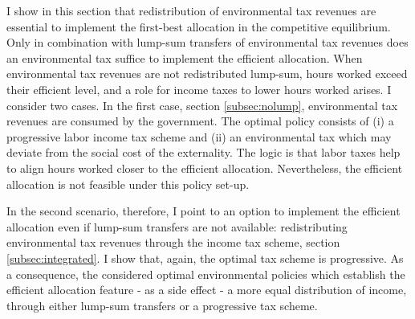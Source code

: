 I show in this section that redistribution of environmental tax revenues are essential to implement the first-best allocation in the competitive equilibrium. Only in combination with lump-sum transfers of  environmental tax revenues does an environmental tax suffice to implement the efficient allocation. %
When environmental tax revenues are not redistributed lump-sum, hours worked exceed their efficient level, and a role for income taxes to lower hours worked arises. I consider two cases.
In the first case, section \ref{subsec:nolump}, environmental tax revenues are consumed by the government. The optimal policy consists of (i) a progressive labor income tax scheme and (ii) an environmental tax which may deviate from the social cost of the externality. The logic is that labor taxes help to align hours worked closer to the efficient allocation. 
Nevertheless, the efficient allocation is not feasible under this policy set-up.

In the second scenario, therefore, I point to an option to implement the efficient allocation even if lump-sum transfers are not available: redistributing environmental tax revenues through the income tax scheme, section \ref{subsec:integrated}.
 I show that, again, the optimal tax scheme is progressive. 
As a consequence, the considered optimal environmental policies which establish the efficient allocation feature - as a side effect - a more equal distribution of income, through either lump-sum transfers or a progressive tax scheme.%


